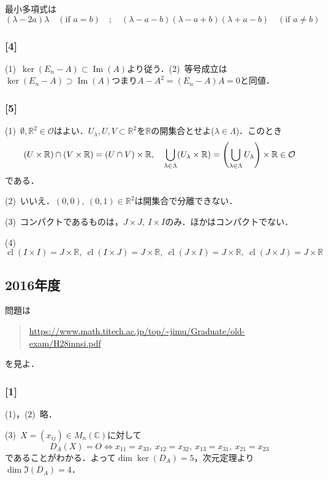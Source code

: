 \documentclass[a4j]{ltjsarticle}
\newcommand{\Rset}{\mathbb{R}}
\newcommand{\Cset}{\mathbb{C}}
\newcommand{\1}{\mathbbm{1}}
\numberwithin{equation}{section}
\theoremstyle{definition}
\begin{document}
最小多項式は
\begin{equation}
    (\lambda-2a)\lambda\quad (\text{if $a=b$})\quad ; \quad (\lambda-a-b)(\lambda-a+b)(\lambda+a-b) \quad (\text{if $a\neq b$})
\end{equation}
\subsubsection*{[4]}
(1)\ $\ker(E_n-A)\subset \mathop{\text{Im}}(A)$より従う．(2)\ 等号成立は$\ker(E_n-A)\supset \mathop{\text{Im}}(A)$つまり$A-A^2=(E_n-A)A=0$と同値．
\subsubsection*{[5]}
(1)\ $\emptyset,\Rset^2\in\mathcal{O}$はよい．$U_\lambda,U,V\subset \Rset^2$を$\Rset$の開集合とせよ($\lambda\in\Lambda$)．このとき
\begin{equation}
    (U\times \Rset)\cap (V\times \Rset)=(U\cap V)\times \Rset,\quad \bigcup_{\lambda\in\Lambda}(U_\lambda\times \Rset)=\qty(\bigcup_{\lambda\in\Lambda}U_{\lambda})\times \Rset\in\mathcal{O}
\end{equation}
である．

(2)\ いいえ．$(0,0),\ (0,1)\in\Rset^2$は開集合で分離できない．

(3)\ コンパクトであるものは，$J\times J,\ I\times I$のみ．ほかはコンパクトでない．

(4)\ $\mathop{\text{cl}}(I\times I)=J\times \Rset,\ \mathop{\text{cl}}(I\times J)=J\times \Rset,\ \mathop{\text{cl}}(J\times I)=J\times \Rset,\ \mathop{\text{cl}}(J\times J)=J\times \Rset$
\subsection{2016年度}
問題は
\begin{quote}
    \url{https://www.math.titech.ac.jp/top/~jimu/Graduate/old-exam/H28innsi.pdf}
\end{quote}
を見よ．
\subsubsection*{[1]}
(1)，(2)\ 略．

(3)\ $X=(x_{ij})\in M_n(\Cset)$に対して
\begin{equation}
    D_A(X)=O\iff x_{11}=x_{33},\ x_{12}=x_{32},\ x_{13}=x_{31},\ x_{21}=x_{23}
\end{equation}
であることがわかる．よって$\dim \ker(D_A)=5$，次元定理より$\dim \Im(D_A)=4$．
\end{document}
